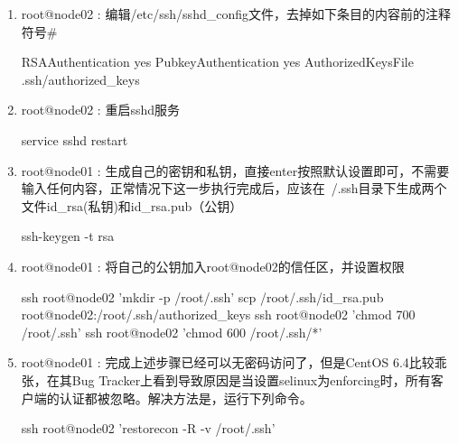 \documentclass[a4paper]{article}
\begin{document}
\begin{enumerate} %
  \item root@node02 : 编辑/etc/ssh/sshd\_config文件，去掉如下条目的内容前的注释符号\#
    \begin{pyglist}[language=bash]
      RSAAuthentication yes
      PubkeyAuthentication yes
      AuthorizedKeysFile     .ssh/authorized_keys
    \end{pyglist}

  \item root@node02 : 重启sshd服务
    \begin{pyglist}[language=bash]
      service sshd restart
    \end{pyglist}

  \item root@node01 : 生成自己的密钥和私钥，直接enter按照默认设置即可，不需要输入任何内容，正常情况下这一步执行完成后，应该在~/.ssh目录下生成两个文件id\_rsa(私钥)和id\_rsa.pub（公钥）
    \begin{pyglist}[language=bash]
      ssh-keygen -t rsa
    \end{pyglist}
  
 \item root@node01 : 将自己的公钥加入root@node02的信任区，并设置权限
   \begin{pyglist}[language=bash]
     ssh root@node02 'mkdir -p /root/.ssh'
     scp /root/.ssh/id_rsa.pub root@node02:/root/.ssh/authorized_keys
     ssh root@node02 'chmod  700 /root/.ssh'
     ssh root@node02 'chmod  600 /root/.ssh/*'
   \end{pyglist}
 
 \item root@node01 : 完成上述步骤已经可以无密码访问了，但是CentOS 6.4比较乖张，在其Bug Tracker上看到导致原因是当设置selinux为enforcing时，所有客户端的认证都被忽略。解决方法是，运行下列命令。
   \begin{pyglist}[language=bash]
     ssh root@node02 'restorecon -R -v /root/.ssh'
   \end{pyglist}
\end{enumerate}
\end{document}
